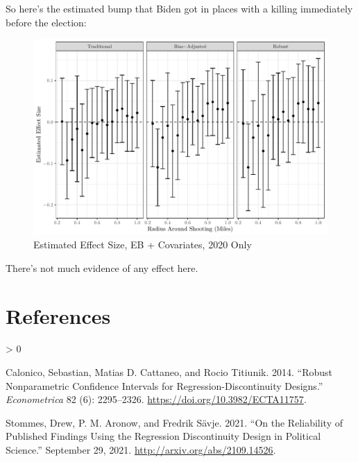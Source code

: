\documentclass[
  12pt,
]{article}
\newlength{\cslhangindent}
\newenvironment{CSLReferences}[2] %
 {%
  \setlength{\parindent}{0pt}
  \ifodd #1 \everypar{\setlength{\hangindent}{\cslhangindent}}\ignorespaces\fi
  \ifnum #2 > 0
  \setlength{\parskip}{#2\baselineskip}
  \fi
 }%
 {}
\begin{document}
So here's the estimated bump that Biden got in places with a killing immediately before the election:

\begin{figure}[H]

{\centering \includegraphics{shoot_to_files/figure-latex/dists-chunk-results-1} 

}

\caption{\label{fig:map}Estimated Effect Size, EB + Covariates, 2020 Only}\label{fig:dists-chunk-results}
\end{figure}

There's not much evidence of any effect here.

\newpage

\hypertarget{references}{%
\section*{References}\label{references}}

\hypertarget{refs}{}
\begin{CSLReferences}{1}{0}
\leavevmode\hypertarget{ref-Calonico2014}{}%
Calonico, Sebastian, Matias D. Cattaneo, and Rocio Titiunik. 2014. {``Robust {Nonparametric Confidence Intervals} for {Regression}-{Discontinuity Designs}.''} \emph{Econometrica} 82 (6): 2295--2326. \url{https://doi.org/10.3982/ECTA11757}.

\leavevmode\hypertarget{ref-Stommes2021}{}%
Stommes, Drew, P. M. Aronow, and Fredrik Sävje. 2021. {``On the Reliability of Published Findings Using the Regression Discontinuity Design in Political Science.''} September 29, 2021. \url{http://arxiv.org/abs/2109.14526}.

\end{CSLReferences}
\end{document}
